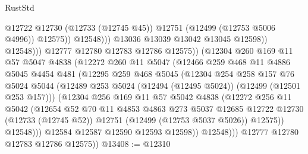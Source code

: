 \begin{lexlean}{RustStd}
\begin{coremodule}
                                    @12722
                                    @12730
                                    (@12733 (@12745 @45))
                                    @12751
                                    (@12499 (@12753 @5006 @4996))
                                    @12575))
                                @12548)))
                          @13036
                          @13039
                          @13042
                          @13045
                          @12598))
                      @12548)))
                @12777
                @12780
                @12783
                @12786
                @12575))
            (@12304
              @260
              @169
              @11
              @57
              @5047
              @4838
              (@12272
                @260
                @11
                @5047
                (@12466
                  @259
                  @468
                  @11
                  @4886
                  @5045
                  @4454
                  @481
                  (@12295
                    @259
                    @468
                    @5045
                    (@12304
                      @254
                      @258
                      @157
                      @76
                      @5024
                      @5044
                      (@12489 @253 @5024 (@12494 (@12495 @5024)) (@12499 (@12501 @253 @157)))
                      (@12304
                        @256
                        @169
                        @11
                        @57
                        @5042
                        @4838
                        (@12272
                          @256
                          @11
                          @5042
                          (@12654
                            @52
                            @70
                            @11
                            @4853
                            @4863
                            @273
                            @5037
                            @12685
                            @12722
                            @12730
                            (@12733 (@12745 @52))
                            @12751
                            (@12499 (@12753 @5037 @5026))
                            @12575))
                        @12548)))
                  @12584
                  @12587
                  @12590
                  @12593
                  @12598))
              @12548)))
        @12777
        @12780
        @12783
        @12786
        @12575))
@13408 := @12310

\end{coremodule}
\end{lexlean}
